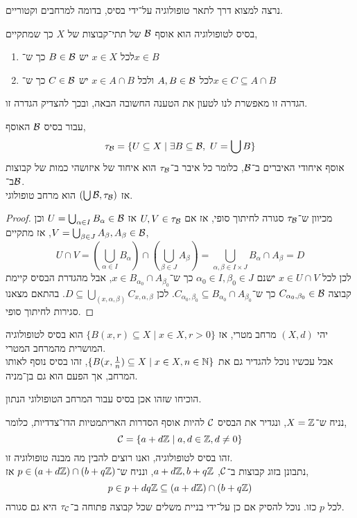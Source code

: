 נרצה למצוא דרך לתאר טופולוגיה על־ידי בסיס, בדומה למרחבים וקטוריים.
\begin{definition}\label{topology_basis_definition}
	בסיס לטופולוגיה הוא אוסף $\mathcal{B}$ של תתי־קבוצות של $X$ כך שמתקיים,
	\begin{enumerate}
		\item לכל $x \in X$ יש $B \in \mathcal{B}$ כך ש־$x \in B$
		\item לכל $A, B \in \mathcal{B}$ ולכל $x \in A \cap B$ יש $C \in \mathcal{B}$ כך ש־$x \in C \subseteq A \cap B$
	\end{enumerate}
\end{definition}
הגדרה זו מאפשרת לנו לטעון את הטענה החשובה הבאה, ובכך להצדיק הגדרה זו.
\begin{proposition}
	עבור בסיס $\mathcal{B}$ האוסף,
	\[
		\tau_{\mathcal{B}}
		= \{ U \subseteq X \mid \exists B \subseteq \mathcal{B},\ U = \bigcup B \}
	\]
	אוסף איחודי האיברים ב־$\mathcal{B}$, כלומר כל איבר ב־$\tau_{\mathcal{B}}$ הוא איחוד של איזושהי כמות של קבוצות ב־$\mathcal{B}$. \\
	אז $(\bigcup \mathcal{B}, \tau_{\mathcal{B}})$ הוא מרחב טופולוגי.
\end{proposition}
\begin{proof}
	מכיוון ש־$\tau_{\mathcal{B}}$ סגורה לחיתוך סופי, אז אם $U, V \in \tau_{\mathcal{B}}$ אז $U = \bigcup_{\alpha \in I} B_\alpha \in \mathcal{B}$ וכן $V = \bigcup_{\beta \in J} A_\beta, A_\beta \in \mathcal{B}$, אז מתקיים,
	\[
		U \cap V
		= (\bigcup_{\alpha \in I} B_\alpha) \cap (\bigcup_{\beta \in J} A_\beta)
		= \bigcup_{\alpha, \beta \in I \times J} B_\alpha \cap A_\beta
		= D
	\]
	לכן לכל $x \in U \cap V$ ישנם $\alpha_0 \in I, \beta_0 \in J$ כך ש־$x \in B_{\alpha_0} \cap A_{\beta_0}$,
	אבל מהגדרת הבסיס קיימת קבוצה $C_{\alpha_0, \beta_0} \in \mathcal{B}$ כך ש־$C_{\alpha_0, \beta_0} \subseteq B_{\alpha_0} \cap A_{\beta_0}$.
	לכן $D \subseteq \bigcup_{(x, \alpha, \beta)} C_{x, \alpha, \beta}$.
	בהתאם מצאנו סגירות לחיתוך סופי.
\end{proof}
\begin{remark}
	יהי $(X, d)$ מרחב מטרי, אז $\{ B(x, r) \subseteq X \mid x \in X, r > 0 \}$ הוא בסיס לטופולוגיה המושרית מהמרחב המטרי. \\
	אבל עכשיו נוכל להגדיר גם את $\{ B(x, \frac{1}{n}) \subseteq X \mid x \in X, n \in \mathbb{N} \}$, זהו בסיס נוסף לאותו המרחב, אך הפעם הוא גם בן־מניה.
\end{remark}
\begin{exercise}
	הוכיחו שזהו אכן בסיס עבור המרחב הטופולוגי הנתון.
\end{exercise}
\begin{example}
	נניח ש־$X = \mathbb{Z}$, ונגדיר את הבסיס $\mathcal{C}$ להיות אוסף הסדרות האריתמטיות הדו־צדדיות, כלומר,
	\[
		\mathcal{C} = \{ a + d \mathbb{Z} \mid a, d \in \mathbb{Z}, d \ne 0 \}
	\]
	זהו בסיס לטופולוגיה, ואנו רוצים להבין מה מבנה טופולוגיה זו. \\
	נתבונן בזוג קבוצות ב־$\mathcal{C}$, $a + d \mathbb{Z}, b + q \mathbb{Z}$, ונניח ש־$p \in (a + d \mathbb{Z}) \cap (b + q \mathbb{Z})$ אז,
	\[
		p \in p + dq \mathbb{Z} \subseteq (a + d \mathbb{Z}) \cap (b + q \mathbb{Z})
	\]
	לכל $p$ כזו.
	נוכל להסיק אם כן על־ידי בניית משלים שכל קבוצה פתוחה ב־$\tau_{\mathcal{C}}$ היא גם סגורה.
\end{example}
